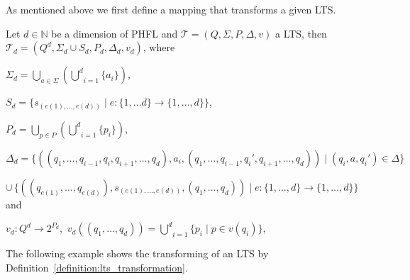 As mentioned above we first define a mapping that transforms a given LTS.

\begin{definition}
    \label{definition:lts_transformation}
    Let $d \in \mathbb{N}$ be a dimension of PHFL and $\mathcal{T} = (Q, \Sigma, P, \Delta, v)$ a LTS, then
    $\mathcal{T}_d = (Q^d, \Sigma_d \cup S_d, P_d, \Delta_d, v_d)$, where
    \begin{compactitem}
        \item $\Sigma_d = \underset{a \in \Sigma}{\bigcup}(\underset{i = 1}{\overset{d}{\bigcup}} \{a_i\})$,
        \item $S_d = \{s_{(e(1), \dots, e(d))} \mid e: \{1, \dots d\} \rightarrow \{1, \dots, d\}\}$,
        \item $P_d = \underset{p \in P}{\bigcup}(\underset{i = 1}{\overset{d}{\bigcup}} \{p_i\})$,
        \item $\Delta_d = \{((q_1, \dots ,q_{i - 1}, q_i, q_{i + 1}, \dots, q_d), a_i, (q_1, \dots ,q_{i - 1},
        {q_i}', q_{i + 1}, \dots, q_d)) \mid (q_i, a, {q_i}') \in \Delta\}$

        $\cup\,\{((q_{e(1)}, \dots, q_{e(d)}), s_{(e(1),
        \dots, e(d))}, (q_1, \dots, q_d)) \mid e: \{1, \dots, d\} \rightarrow \{1, \dots, d\}\}$ and
        \item $v_d \colon Q^d \rightarrow 2^{P_d}, $
        $v_d((q_1, \dots, q_d)) = \underset{i = 1}{\overset{d}{\bigcup}} \{p_i \mid p \in v(q_i)\}$,
    \end{compactitem}
\end{definition}

The following example shows the transforming of an LTS by Definition~\ref{definition:lts_transformation}.

